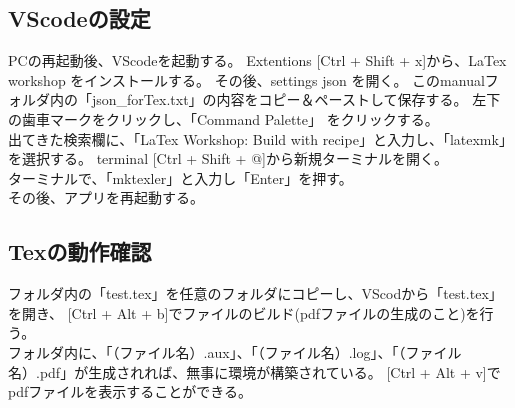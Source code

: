 \documentclass[a4paper]{jsarticle}
\begin{document}
\subsection{VScodeの設定}
PCの再起動後、VScodeを起動する。
Extentions [Ctrl + Shift + x]から、LaTex workshop をインストールする。
その後、settings json を開く。
このmanualフォルダ内の「json\_forTex.txt」の内容をコピー＆ペーストして保存する。
左下の歯車マークをクリックし、「Command Palette」 をクリックする。\\
出てきた検索欄に、「LaTex Workshop: Build with recipe」と入力し、「latexmk」を選択する。
terminal [Ctrl + Shift + @]から新規ターミナルを開く。\\
ターミナルで、「mktexler」と入力し「Enter」を押す。\\
その後、アプリを再起動する。\\
\subsection{Texの動作確認}
フォルダ内の「test.tex」を任意のフォルダにコピーし、VScodから「test.tex」を開き、
[Ctrl + Alt + b]でファイルのビルド(pdfファイルの生成のこと)を行う。\\
フォルダ内に、「（ファイル名）.aux」、「（ファイル名）.log」、「（ファイル名）.pdf」が生成されれば、無事に環境が構築されている。
[Ctrl + Alt + v]でpdfファイルを表示することができる。
\end{document}
